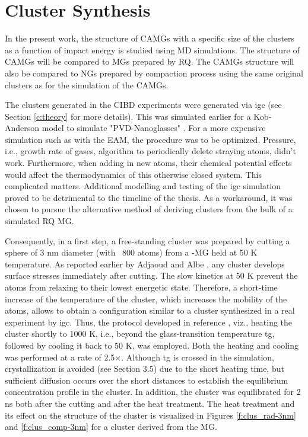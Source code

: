 \section{Cluster Synthesis}

\begin{selfcite}
In the present work, the structure of CAMGs with a specific size of the clusters as a function of impact energy is studied using MD simulations. The structure of CAMGs will be compared to MGs prepared by RQ. The CAMGs structure will also be compared to NGs prepared by compaction process using the same original clusters as for the simulation of the CAMGs. \par
\end{selfcite}

The clusters generated in the CIBD experiments \cite{Benel2018,Benel2019} were generated via \gls{igc} (see Section \ref{c:theory} for more details). This was simulated earlier for a Kob-Anderson model to simulate "PVD-Nanoglasses" \cite{Danilov2016}. For a more expensive simulation such as with the EAM, the procedure was to be optimized. Pressure, i.e., growth rate of gases, algorithm to periodically delete straying atoms, didn't work. Furthermore, when adding in new atoms, their chemical potential effects would affect the thermodynamics of this otherwise closed system. This complicated matters. Additional modelling and testing of the \gls{igc} simulation proved to be detrimental to the timeline of the thesis. As a workaround, it was chosen to pursue the alternative method of deriving clusters from the bulk of a simulated RQ MG. \par

\begin{selfcite}
Consequently, in a first step, a free-standing cluster was prepared by cutting a sphere of 3 nm diameter (with ~800 atoms) from a  \cz-MG held at 50 K temperature. As reported earlier by Adjaoud and Albe \cite{Adjaoud2016}, any cluster develops surface stresses immediately after cutting. The slow kinetics at 50 K prevent the atoms from relaxing to their lowest energetic state. Therefore, a short-time increase of the temperature of the cluster, which increases the mobility of the atoms, allows to obtain a configuration similar to a cluster synthesized in a real experiment by \gls{igc}. Thus, the protocol developed in reference \cite{Adjaoud2016}, viz., heating the cluster shortly to 1000 K, i.e., beyond the glass-transition temperature \gls{tg}, followed by cooling it back to 50 K, was employed. Both the heating and cooling was performed at a rate of 2.5×. Although \gls{tg} is crossed in the simulation, crystallization is avoided (see Section 3.5) due to the short heating time, but sufficient diffusion occurs over the short distances to establish the equilibrium concentration profile in the cluster. In addition, the cluster was equilibrated for 2 ns both after the cutting and after the heat treatment. The heat treatment and its effect on the structure of the cluster is visualized in Figures \ref{f:clus_rad-3nm} and \ref{f:clus_comp-3nm} for a cluster derived from the  MG. \par
\end{selfcite}

